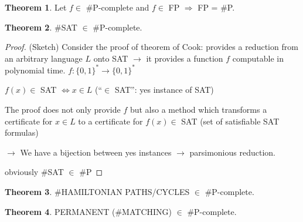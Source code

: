 \documentclass[11pt]{article}
\theoremstyle{definition}
\newtheorem{theorem}{Theorem}[section]
\theoremstyle{definition}
\begin{document}
\begin{theorem}
Let $ f \in $ \#P-complete and $ f \in $ FP $ \Rightarrow $ FP = \#P.
\end{theorem}

\begin{theorem}
\#SAT $ \in $ \#P-complete.
\end{theorem}

\begin{proof} (Sketch)
Consider the proof of theorem of Cook: provides a reduction from an arbitrary language $ L $ onto SAT $ \rightarrow $ it provides a function $ f $ computable in polynomial time. $ f : \{0, 1\}^\ast \rightarrow \{0, 1\}^\ast $

$ f(x) \in $ SAT $ \Leftrightarrow x \in L $ (``$ \in $ SAT'': yes instance of SAT)

The proof does not only provide $ f $ but also a method which transforms a certificate for $ x \in L $ to a certificate for $ f(x) \in $ SAT (set of satisfiable SAT formulas)

$ \rightarrow $ We have a bijection between yes instances $ \rightarrow $ parsimonious reduction.

obviously \#SAT $\in $ \#P

\end{proof}

\begin{theorem}
\#HAMILTONIAN PATHS/CYCLES $ \in $ \#P-complete.
\end{theorem}

\begin{theorem}
PERMANENT (\#MATCHING) $ \in $ \#P-complete.
\end{theorem}
\end{document}
